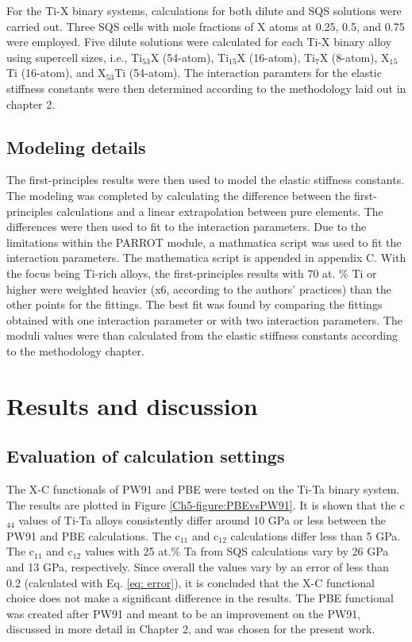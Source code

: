 For the Ti-X binary systems, calculations for both dilute and SQS solutions were carried out. Three SQS cells with mole fractions of X atoms at 0.25, 0.5, and 0.75 were employed. Five dilute solutions were calculated for each Ti-X binary alloy using supercell sizes, i.e., Ti$_{53}$X (54-atom), Ti$_{15}$X (16-atom), Ti$_{7}$X (8-atom), X$_{15}$Ti (16-atom), and X$_{53}$Ti (54-atom). The interaction paramters for the  elastic stiffness constants were then determined according to the methodology laid out in chapter 2. 

\subsection{Modeling details}

The first-principles results were then used to model the elastic stiffness constants. The modeling was completed by calculating the difference between the first-principles calculations and a linear extrapolation between pure elements. The differences were then used to fit to the interaction parameters. Due to the limitations within the PARROT module, a mathmatica script was used to fit the interaction parameters. The mathematica script is appended in appendix C. With the focus being Ti-rich alloys, the first-principles results with 70 at. \% Ti or higher were weighted heavier (x6, according to the authors' practices) than the other points for the fittings. The best fit was found by comparing the fittings obtained with one interaction parameter or with two interaction parameters. The moduli values were than calculated from the elastic stiffness constants according to the methodology chapter.

\section{Results and discussion}

\subsection{Evaluation of calculation settings}

The X-C functionals of PW91 and PBE were tested on the Ti-Ta binary system. The results are plotted in Figure \ref{Ch5-figure:PBEvsPW91}. It is shown that the c$_{44}$ values of Ti-Ta alloys consistently differ around 10 GPa or less between the PW91 and PBE calculations. The c$_{11}$ and c$_{12}$ calculations differ less than 5 GPa. The c$_{11}$ and c$_{12}$ values with 25 at.$\%$ Ta from SQS calculations vary by 26 GPa and 13 GPa, respectively. Since overall the values vary by an error of less than 0.2 (calculated with Eq. \ref{eq: error}), it is concluded that the X-C functional choice does not make a significant difference in the results. The PBE functional was created after PW91 and meant to be an improvement on the PW91, discussed in more detail in Chapter 2, and was chosen for the present work. 

